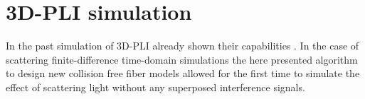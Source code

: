 \setcounter{chapter}{4}
\chapter{\acs{3D-PLI} simulation}
\label{cha:sof:simulation}
%
%
%
%
%
In the past simulation of \ac{3D-PLI} already shown their capabilities \cite{Dohmen2015,Menzel2015,Menzel2016,Menzel2020,Menzel2021,MenzelMaster,MenzelDissertation}.
In the case of scattering finite-difference time-domain simulations the here presented algorithm to design new collision free fiber models allowed for the first time to simulate the effect of scattering light without any superposed interference signals.
